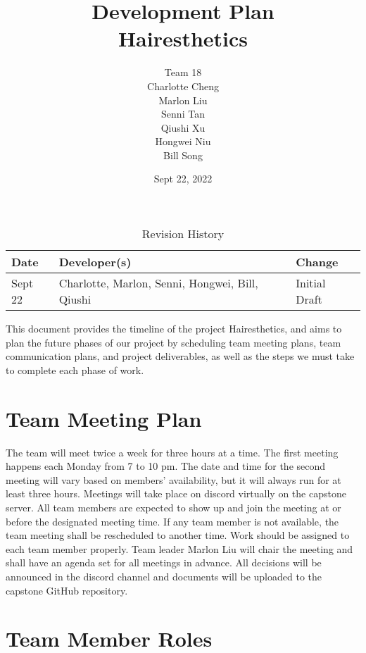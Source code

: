 \documentclass{article}
\title{Development Plan\\Hairesthetics}
\author{Team 18 \\ Charlotte Cheng
        \\ Marlon Liu
        \\ Senni Tan
        \\ Qiushi Xu
        \\ Hongwei Niu
        \\ Bill Song
}
\date{Sept 22, 2022}
\begin{document}
\maketitle

\begin{table}[hp]
\caption{Revision History} \label{TblRevisionHistory}
\begin{tabularx}{\textwidth}{llX}
\toprule
\textbf{Date} & \textbf{Developer(s)} & \textbf{Change}\\
\midrule
Sept 22 & Charlotte, Marlon, Senni, Hongwei, Bill, Qiushi & Initial Draft\\
\bottomrule
\end{tabularx}
\end{table}

\newpage

\maketitle
This document provides the timeline of the project Hairesthetics, and aims to plan the future phases of our project by scheduling team meeting plans, team communication plans, and project deliverables, as well as the steps we must take to complete each phase of work.

\section{Team Meeting Plan}
The team will meet twice a week for three hours at a time. The first meeting happens each Monday from 7 to 10 pm. The date and time for the second meeting will vary based on members' availability, but it will always run for at least three hours.
Meetings will take place on discord virtually on the capstone server. All team members are expected to show up and join the meeting at or before the designated meeting time. If any team member is not available, the team meeting shall be rescheduled to another time. Work should be assigned to each team member properly. Team leader Marlon Liu will chair the meeting and shall have an agenda set for all meetings in advance. All decisions will be announced in the discord channel and documents will be uploaded to the capstone GitHub repository.

\section{Team Member Roles}
\end{document}
